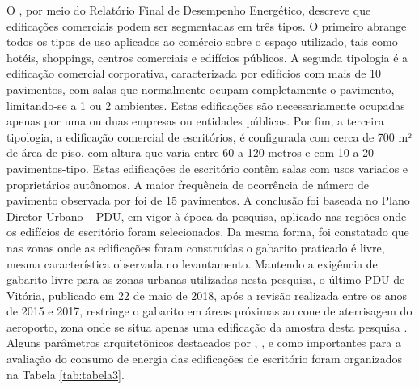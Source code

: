 O \textcite{ConselhoBrasileirodeConstrucaoSustentavel-CBCS2015}, por meio do Relatório Final de Desempenho Energético, descreve que edificações comerciais podem ser segmentadas em três tipos. O primeiro abrange todos os tipos de uso aplicados ao comércio sobre o espaço utilizado, tais como hotéis, shoppings, centros comerciais e edifícios públicos. A segunda tipologia é a edificação comercial corporativa, caracterizada por edifícios com mais de 10 pavimentos, com salas que normalmente ocupam completamente o pavimento, limitando-se a 1 ou 2 ambientes. Estas edificações são necessariamente ocupadas apenas por uma ou duas empresas ou entidades públicas. Por fim, a terceira tipologia, a edificação comercial de escritórios, é configurada com cerca de 700 m² de área de piso, com altura que varia entre 60 a 120 metros e com 10 a 20 pavimentos-tipo. Estas edificações de escritório contêm salas com usos variados e proprietários autônomos.\vspace*{0.3cm}\newline
A maior frequência de ocorrência de número de pavimento observada por \textcite{Bernabe2012} foi de 15 pavimentos. A conclusão foi baseada no Plano Diretor Urbano – PDU, em vigor à época da pesquisa, aplicado nas regiões onde os edifícios de escritório foram selecionados. Da mesma forma, foi constatado que nas zonas onde as edificações foram construídas o gabarito praticado é livre, mesma característica observada no levantamento. Mantendo a exigência de gabarito livre para as zonas urbanas utilizadas nesta pesquisa, o último PDU de Vitória, publicado em 22 de maio de 2018, após a revisão realizada entre os anos de 2015 e 2017, restringe o gabarito em áreas próximas ao cone de aterrisagem do aeroporto, zona onde se situa apenas uma edificação da amostra desta pesquisa \cite{PrefeituraMunicipaldeVitoria-PMV2018}.\vspace*{0.3cm}\newline
Alguns parâmetros arquitetônicos destacados por \textcite{Lamberts2006}, \textcite{Bernabe2012}, e \textcite{Fonseca2016} como importantes para a avaliação do consumo de energia das edificações de escritório foram organizados na Tabela \ref{tab:tabela3}.\newline
